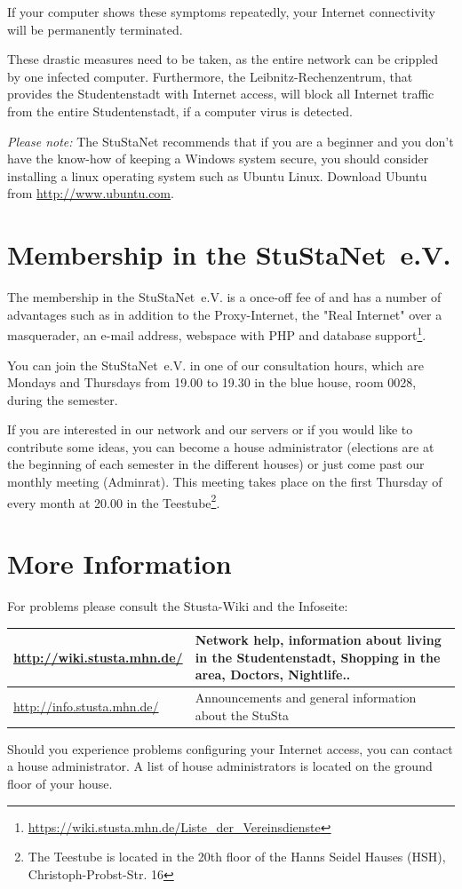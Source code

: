 \documentclass[a4paper,12pt]{scrartcl}
\begin{document}
\begin{em}
If your computer shows these symptoms repeatedly, your Internet connectivity will be permanently terminated.
\end{em}

These drastic measures need to be taken, as the entire network can be crippled by one infected computer. Furthermore, the Leibnitz-Rechenzentrum, that provides the Studentenstadt with Internet access, will block all Internet traffic from the entire Studentenstadt, if a computer virus is detected.

\emph{Please note:} The StuStaNet recommends that if you are a beginner and you don't have the know-how of keeping a Windows system secure, you should consider installing a linux operating system such as Ubuntu Linux. Download Ubuntu from \url{http://www.ubuntu.com}.


\section*{Membership in the StuStaNet~e.V.}

The membership in the StuStaNet~e.V. is a once-off fee of  and has a number of advantages such as in addition to the Proxy-Internet, the "Real Internet" over a masquerader, an e-mail address, webspace with PHP and database support\footnote{\url{https://wiki.stusta.mhn.de/Liste\_der\_Vereinsdienste}}.

You can join the StuStaNet~e.V. in one of our consultation hours, which are Mondays and Thursdays from 19.00 to 19.30 in the blue house, room 0028, during the semester.

If you are interested in our network and our servers or if you would like to contribute some ideas, you can become a house administrator (elections are at the beginning of each semester in the different houses) or just come past our monthly meeting (Adminrat). This meeting takes place on the first Thursday of every month at 20.00 in the Teestube\footnote{The Teestube is located in the 20th floor of the Hanns Seidel Hauses (HSH), Christoph-Probst-Str. 16}.

\section*{More Information}

For problems please consult the Stusta-Wiki and the Infoseite:

\begin{center}
  \begin{tabularx}{\linewidth}{|lX|}
    \hline
    \url{http://wiki.stusta.mhn.de/} & Network help, information about living in the Studentenstadt, Shopping in the area, Doctors, Nightlife..\\
    \hline
    \url{http://info.stusta.mhn.de/} & Announcements and general information about the StuSta\\
    \hline
  \end{tabularx}
\end{center}
Should you experience problems configuring your Internet access, you can contact a house administrator. A list of house administrators is located on the ground floor of your house.
\end{document}
